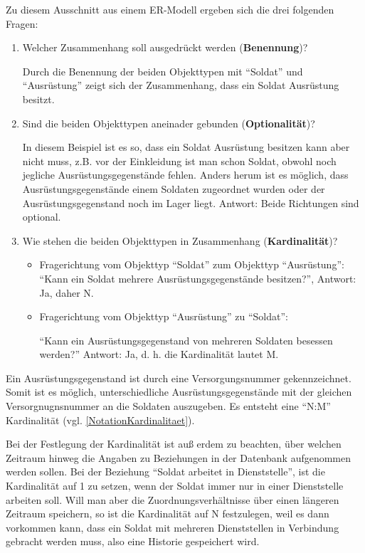         Zu diesem Ausschnitt aus einem ER-Modell ergeben sich die drei folgenden Fragen:
        \begin{enumerate}
          \item Welcher Zusammenhang soll ausgedrückt werden (\textbf{Benennung})?

          Durch die Benennung der beiden Objekttypen mit \enquote{Soldat} und \enquote{Ausrüstung} zeigt sich der Zusammenhang, dass ein Soldat Ausrüstung besitzt.
\clearpage
          \item Sind die beiden Objekttypen aneinader gebunden (\textbf{Optionalität})?

          In diesem Beispiel ist es so, dass ein Soldat Ausrüstung besitzen kann aber nicht muss, z.B. vor der Einkleidung ist man schon Soldat, obwohl noch jegliche Ausrüstungsgegenstände fehlen. Anders herum ist es möglich, dass Ausrüstungsgegenstände einem Soldaten
          zugeordnet wurden oder der Ausrüstungsgegenstand noch im Lager liegt.
          Antwort: Beide Richtungen sind optional.
          \item Wie stehen die beiden Objekttypen in Zusammenhang (\textbf{Kardinalität})?

          \begin{itemize}
            \item Fragerichtung vom Objekttyp \enquote{Soldat}  zum Objekttyp \enquote{Ausrüstung}:
            \enquote{Kann ein Soldat mehrere Ausrüstungsgegenstände besitzen?}, Antwort: Ja, daher N.
            \item Fragerichtung vom Objekttyp \enquote{Ausrüstung}  zu \enquote{Soldat}:

            \enquote{Kann ein Ausrüstungsgegenstand von mehreren Soldaten besessen werden?}
            Antwort: Ja, d. h. die Kardinalität lautet M.
          \end{itemize}
        \end{enumerate}
        Ein Ausrüstungsgegenstand ist durch eine Versorgungsnummer
        gekennzeichnet. Somit ist es möglich, unterschiedliche
        Ausrüstungsgegenstände mit der gleichen Versorgnugnsnummer an die
        Soldaten auszugeben. Es entsteht eine \enquote{N:M} Kardinalität (vgl.
        \ref{NotationKardinalitaet}).

        Bei der Festlegung der Kardinalität ist auß erdem zu beachten,
        über welchen Zeitraum hinweg die Angaben zu Beziehungen in der
        Datenbank aufgenommen werden sollen. Bei der Beziehung \enquote{Soldat
        arbeitet in Dienststelle}, ist die Kardinalität auf 1 zu setzen, wenn
        der Soldat immer nur in einer Dienststelle arbeiten soll. Will man aber
        die Zuordnungsverhältnisse über einen längeren Zeitraum speichern,
        so ist die Kardinalität auf N festzulegen, weil es dann vorkommen
        kann, dass ein Soldat mit mehreren Dienststellen in Verbindung gebracht
        werden muss, also eine Historie gespeichert wird.
